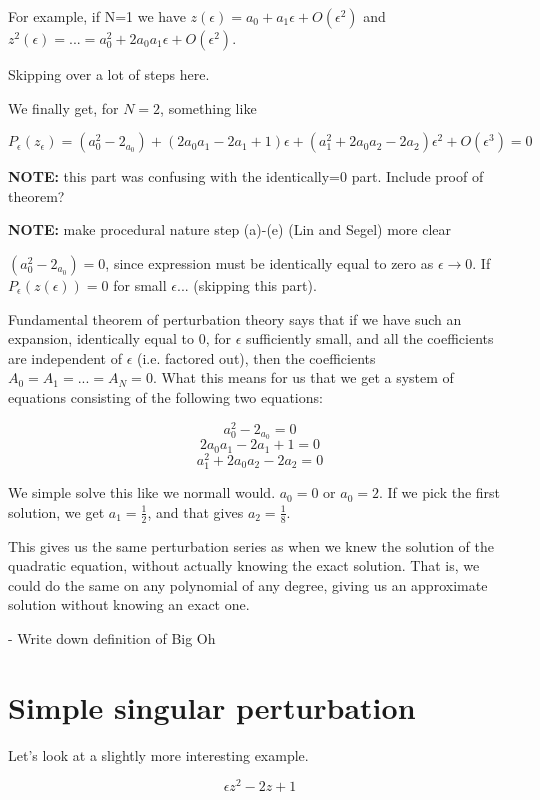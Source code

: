 \documentclass[12pt]{report}
\begin{document}
For example, if N=1 we have $z(\epsilon) = a_0 + a_1\epsilon + O(\epsilon^2)$
and $z^2(\epsilon) = ... = a_0^2 + 2 a_0 a_1 \epsilon + O(\epsilon^2)$.

Skipping over a lot of steps here.

We finally get, for $N=2$, something like

$$P_\epsilon(z_\epsilon) = (a_0^2 - 2_{a_0}) + (2 a_0 a_1 - 2 a_1 +1)\epsilon + (a_1^2 + 2 a_0 a_2 -
2 a_2)\epsilon^2 + O(\epsilon^3) = 0$$

\textbf{NOTE:} this part was confusing with the identically=0 part. Include proof of theorem?

\textbf{NOTE:} make procedural nature step (a)-(e) (Lin and Segel) more clear

$(a_0^2 - 2_{a_0}) = 0$, since expression must be identically equal to zero as
$\epsilon \to 0$. If $P_\epsilon(z(\epsilon)) = 0$ for small $\epsilon$... (skipping this part).

Fundamental theorem of perturbation theory says that if we have such an
expansion, identically equal to 0, for $\epsilon$ sufficiently small, and all
the coefficients are independent of $\epsilon$ (i.e. factored out), then the
coefficients $A_0 = A_1 = ... = A_N = 0$. What this means for us that we get a
system of equations consisting of the following two equations:

$$ a_0^2 - 2_{a_0} = 0$$
$$ 2 a_0 a_1 - 2 a_1 +1 = 0 $$
$$ a_1^2 + 2 a_0 a_2 -2 a_2 = 0$$

We simple solve this like we normall would. $a_0 = 0$ or $a_0 = 2$. If we pick
the first solution, we get $a_1=\frac 1 2$, and that gives $a_2 = \frac 1 8$.

This gives us the same perturbation series as when we knew the solution of the
quadratic equation, without actually knowing the exact solution. That is, we
could do the same on any polynomial of any degree, giving us an approximate
solution without knowing an exact one.


- Write down definition of Big Oh

\section{Simple singular perturbation}

Let's look at a slightly more interesting example.

\begin{equation}
  \epsilon z^2 - 2z + 1
\end{equation}
\end{document}
